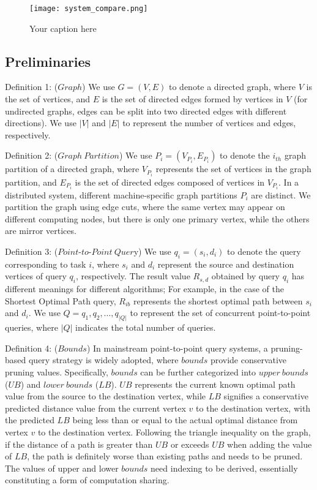 \documentclass[lettersize,journal]{IEEEtran} %
\begin{document}
\begin{figure}[!t]
    \centering
    \texttt{[image: system\_compare.png]}
    \caption{Your caption here}
    \label{fig:system_compare}
  \end{figure}


\subsection{Preliminaries}
Definition 1: ($Graph$) We use $G=(V,E)$ to denote a directed graph, where $V$ is the set of vertices, and $E$ is the set of directed edges formed by vertices in $V$ (for undirected graphs, edges can be split into two directed edges with different directions). We use $|V|$ and $|E|$ to represent the number of vertices and edges, respectively.

Definition 2: ($Graph~Partition$) We use $P_i=(V_{P_i},E_{P_i})$ to denote the $i_{th}  $ graph partition of a directed graph, where $V_{P_i}$ represents the set of vertices in the graph partition, and $E_{P_i}$ is the set of directed edges composed of vertices in $V_{P_i}$. In a distributed system, different machine-specific graph partitions $P_i$ are distinct. We partition the graph using edge cuts, where the same vertex may appear on different computing nodes, but there is only one primary vertex, while the others are mirror vertices.

Definition 3: ($Point \text{-} to \text{-} Point~Quer$y) We use $q_i=(s_i,d_i)$ to denote the query corresponding to task $i$, where $s_i$ and $d_i$ represent the source and destination vertices of query $q_i$, respectively. The result value $R_{s,d}$ obtained by query $q_i$ has different meanings for different algorithms; For example, in the case of the Shortest Optimal Path query, $R_{ib}$ represents the shortest optimal path between $s_i$ and $d_i$. We use $Q={q_1,q_2,\ldots,q_{|Q|}}$ to represent the set of concurrent point-to-point queries, where $|Q|$ indicates the total number of queries.

Definition 4: ($Bounds$) In mainstream point-to-point query systems, a pruning-based query strategy is widely adopted, where $bounds$ provide conservative pruning values. Specifically, $bounds$ can be further categorized into $upper~bounds$ ($UB$) and $lower~bounds$ ($LB$). $UB$ represents the current known optimal path value from the source to the destination vertex, while $LB$ signifies a conservative predicted distance value from the current vertex $v$ to the destination vertex, with the predicted $LB$ being less than or equal to the actual optimal distance from vertex $v$ to the destination vertex. Following the triangle inequality on the graph, if the distance of a path is greater than $UB$ or exceeds $UB$ when adding the value of $LB$, the path is definitely worse than existing paths and needs to be pruned. The values of upper and lower $bounds$ need indexing to be derived, essentially constituting a form of computation sharing.
\end{document}
